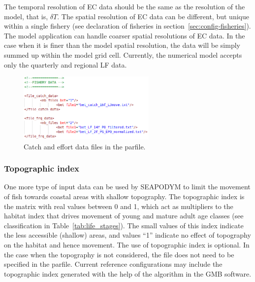 The temporal resolution of EC data should be the same as the resolution of the model, that is, $\delta T$. The spatial resolution of EC data can be different, but unique within a single fishery (see declaration of fisheries in section~\ref{sec:config-fisheries}). The model application can handle coarser spatial resolutions of EC data. In the case when it is finer than the model spatial resolution, the data will be simply summed up within the model grid cell. Currently, the numerical model accepts only the quarterly and regional LF data. 

\begin{figure}[t]
   \centering
   \includegraphics[width=0.6\textwidth]{chapter3/figs/catch_effort_data.png}
   \caption{Catch and effort data files in the parfile.}
   \label{fig:catch_effort_data}
 \end{figure}

\subsubsection{Topographic index}
One more type of input data can be used by SEAPODYM to limit the movement of fish towards coastal areas with shallow topography. The topographic index is the matrix with real values between 0 and 1, which act as multipliers to the habitat index that drives movement of young and mature adult age classes (see classification in Table~\ref{tab:life_stages}). The small values of this index indicate the less accessible (shallow) areas, and values ``1'' indicate no effect of topography on the habitat and hence movement. The use of topographic index is optional. In the case when the topography is not considered, the file does not need to be specified in the parfile. Current reference configurations may include the topographic index generated with the help of the algorithm in the GMB software.


